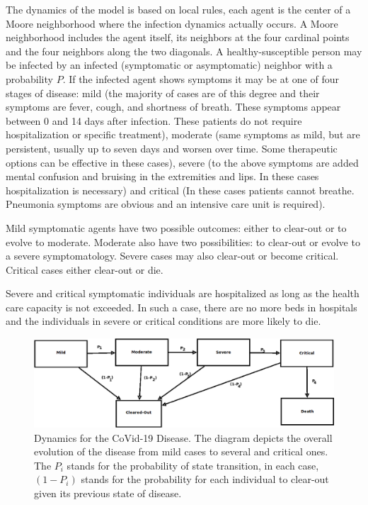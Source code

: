 \documentclass[11pt,a4paper,reqno]{amsart}
\theoremstyle{definition}
\theoremstyle{remark}
\begin{document}
The dynamics of the model is based on local rules, each agent is the center of a Moore neighborhood where the infection dynamics actually occurs. A Moore neighborhood includes the agent itself, its neighbors at the four cardinal points and the four neighbors along the two diagonals. A healthy-susceptible person may be infected by an infected (symptomatic or asymptomatic) neighbor with a probability $P$. If the infected agent shows symptoms it may be at one of four stages of disease: mild (the majority of cases are of this degree and their symptoms are fever, cough, and shortness of breath. These symptoms appear between 0 and 14 days after infection. These patients do not require hospitalization or specific treatment), moderate (same symptoms as mild, but are persistent, usually up to seven days and worsen over time. Some therapeutic options can be effective in these cases), severe (to the above symptoms are added mental confusion and bruising in the extremities and lips. In these cases hospitalization is necessary) and critical (In these cases patients cannot breathe. Pneumonia symptoms are obvious and an intensive care unit is required).

Mild symptomatic agents have two possible outcomes: either to clear-out or to evolve to moderate. Moderate also have two possibilities: to clear-out or  evolve to a severe symptomatology. Severe cases may also clear-out or become critical. Critical cases either clear-out or die. 

Severe and critical symptomatic individuals are hospitalized as long as the health care capacity is not exceeded. In such a case, there are no more beds in hospitals and the individuals in severe or critical conditions are more likely to die.

\begin{figure}[H]
    \centering
    \includegraphics[width=\textwidth]{DiseaseDynamics_2.png}
    \caption{Dynamics for the CoVid-19 Disease. The diagram depicts the overall evolution of the disease from mild cases to several and critical ones. The $P_i$ stands for the probability of state transition, in each case, $(1-P_i)$ stands for the probability for each individual to clear-out given its previous state of disease.}
    \label{disdyn}
\end{figure}
\end{document}
